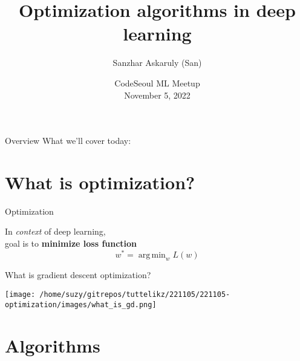 \documentclass{beamer}
\title[CodeSeoul] %
  {Optimization algorithms in deep learning}
\author[AI Research Paper Review] %
  {Sanzhar Askaruly (San)}
\institute[] %
  { Ulsan National Institute of Science and Technology\newline
    Ph.D. Candidate in Biomedical Engineering}
\date[November 5]
{CodeSeoul ML Meetup \\November 5, 2022}
\DeclareMathOperator*{\argmin}{arg\,min}
\begin{document}
    \begin{frame}
    \titlepage %
    \end{frame}


    \begin{frame}{Overview}
      What we'll cover today:
      \tableofcontents
    \end{frame}
    
    \section{What is optimization?} %
    \begin{frame}{Optimization}
      \begin{center}
        \begin{huge}
          In \textit{context} of deep learning, \\
          goal is to \textbf{minimize loss function}
          \vspace{0.2cm}
          \begin{equation}
            \mathit{w}^* = \argmin_{w}L(w)
          \end{equation}
        \end{huge}
      \end{center}
    \end{frame}

    \begin{frame}{What is gradient descent optimization?}
      \begin{center}
          \texttt{[image: /home/suzy/gitrepos/tuttelikz/221105/221105-optimization/images/what\_is\_gd.png]}
      \end{center}
    \end{frame}


    \section{Algorithms} %
\end{document}
